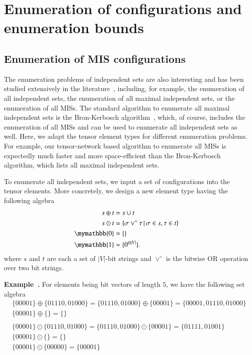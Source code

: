 \documentclass[onefignum, onetabnum]{siamart190516}
\newcommand{\<}{\langle}
\renewcommand{\>}{\rangle}
\newcounter{example}
\newenvironment{example}[1][]{\refstepcounter{example}\par\medskip
   \noindent \textbf{Example~\theexample. #1} \rmfamily}{\medskip}
\begin{document}
\section{Enumeration of configurations and enumeration bounds}
\subsection{Enumeration of MIS configurations}
The enumeration problems of independent sets are also interesting and has been studied extensively in the literature~\cite{Bron1973, Eppstein2010, Johnson1988}, including,
for example, the enumeration of all independent sets, the enumeration of all maximal independent sets, or the enumeration of all MISs.
The standard algorithm to enumerate all maximal independent sets is the Bron-Kerbosch algorithm~\cite{Bron1973}, which, of course, includes the enumeration of all MISs and can be used to enumerate all independent sets as well.
Here, we adapt the tensor element types for different enumeration problems.
For example, our tensor-network based algorithm to enumerate all MISs is expectedly much faster and more space-efficient than the Bron-Kerbosch algorithm, which lists all maximal independent sets. 

To enumerate all independent sets, we input a set of configurations into the tensor elements. More concretely, we design a new element type having the following algebra
\begin{equation}
\begin{split}
    s \oplus t &= s \cup t\\
    s \odot t &= \{\sigma \lor^\circ \tau \, | \, \sigma \in s, \tau \in t\}\\
    \mymathbb{0} &= \{\}\\
    \mymathbb{1} &= \{0^{\otimes |V|}\}.
\end{split}\label{eq:set}
\end{equation}
where $s$ and $t$ are each a set of $|V|$-bit strings and $\lor^\circ$ is the bitwise OR operation over two bit strings.
\begin{example}\label{eg:setalgebra}
    For elements being bit vectors of length $5$, we have the following set algebra
\begin{equation*}
\begin{split}
    &\{00001\} \oplus \{01110, 01000\} = \{01110, 01000\} \oplus \{00001\} = \{00001,01110, 01000\}\\
    &\{00001\} \oplus \{\} = \{\}\\
&\\
    &\{00001\} \odot \{01110, 01000\} = \{01110, 01000\} \odot \{00001\} = \{01111, 01001\}\\
    &\{00001\} \odot \{\} = \{\}\\
    &\{00001\} \odot \{00000\} = \{00001\}
\end{split}
\end{equation*}
\end{example}
\end{document}
